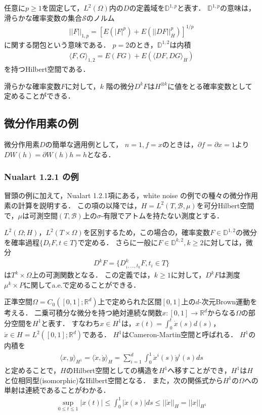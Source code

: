 \documentclass[a4paper,10pt]{jsarticle}
\theoremstyle{plain}
\newcommand{\eq}[1]{\begin{align}#1\end{align}}
\begin{document}
任意に$p\ge1$を固定して，$L^2(\Omega)$内の$D$の定義域を$\mathbb{D}^{1,p}$と表す．
$\mathbb{D}^{1,p}$の意味は，滑らかな確率変数の集合$\mathcal{S}$のノルム
\eq{||F||_{1,p}=\left[E(|F|^p)+E(||DF||_H^p)\right]^{1/p}}
に関する閉包という意味である．
$p=2$のとき，$\mathbb{D}^{1,2}$は内積
\eq{\langle F,G\rangle_{1,2}=E(FG)+E(\langle DF,DG\rangle_H)}
を持つHilbert空間である．

滑らかな確率変数$F$に対して，$k$ 階の微分$D^kF$は$H^{\otimes k}$に値をとる確率変数として定めることができる．

\subsection{微分作用素の例}
微分作用素$D$の簡単な適用例として，
$n=1,f=x$のときは，$\partial f=\partial x=1$より$DW(h)=\partial W(h)h=h$となる．

\subsubsection{Nualart \cite{Nualart2006} 1.2.1 の例}
冒頭の例に加えて，Nualart\cite{Nualart2006} 1.2.1項にある，white noise の例での種々の微分作用素の計算を説明する．
この項の以降では，$H=L^2(T,\mathcal{B},\mu)$を可分Hilbert空間で，$\mu$は可測空間$(T,\mathcal{B})$上の$\sigma$-有限でアトムを持たない測度とする．

$L^2(\Omega ;H)$，$L^2(T\times\Omega)$を区別するため，この場合の，確率変数$F\in\mathbb{D}^{1,2}$の微分を確率過程$\{D_tF,t\in T\}$で定める．
さらに一般に$F\in\mathbb{D}^{k,2},k\ge 2$に対しては，微分
\eq{D^kF=\{D^k_{_1,...,t_k}F,t_i\in T\}}
は$T^k\times\Omega$上の可測関数となる．
この定義では，$k\ge1$に対して，$D^kF$は測度$\mu^k\times P$に関してa.e.で定めることができる．

正準空間$\Omega=C_0([0,1];\mathbb{R}^d)$上で定められた区間$[0,1]$上の$d$-次元Brown運動を考える．
二乗可積分な微分を持つ絶対連続な関数$x:[0,1]\rightarrow\mathbb{R}^d$からなる$\Omega$の部分空間を$H^1$と表す．
すなわち$x\in H^1$は，$x(t)=\int_0^t\dot{x}(s)d(s)$，$\dot{x}\in H=L^2([0,1];\mathbb{R}^d)$である．
$H^1$はCameron-Martin空間と呼ばれる．
$H^1$の内積を
\eq{\langle x,y\rangle_{H^1}=\langle \dot{x},\dot{y}\rangle_{H}=\sum_{i=1}^d\int_0^1\dot{x}^i(s)\dot{y}^i(s)ds}
と定めることで，$H$のHilbert空間としての構造を$H^1$へ移すことができ，$H^1$は$H$と位相同型(isomorphic)なHilbert空間となる．
また，次の関係式から$H^1$の$\Omega$への単射は連続であることがわかる．
\eq{\sup_{0\le t\le1}\left|x(t)\right|\le\int_0^1\left|\dot{x}(s)\right|ds\le||\dot{x}||_H=||x||_{H^1}}
\end{document}
